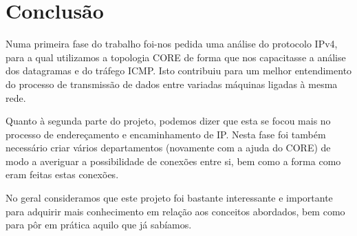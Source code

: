 \documentclass{article}
\begin{document}
\section{Conclusão}
\hspace{0.5cm}Numa primeira fase do trabalho foi-nos pedida uma análise do protocolo IPv4, para a qual utilizamos a topologia CORE de forma que nos capacitasse a análise dos datagramas e do tráfego ICMP. Isto contribuiu para um melhor entendimento do processo de transmissão de dados entre variadas máquinas ligadas à mesma rede. 

\hspace{0.5cm}Quanto à segunda parte do projeto, podemos dizer que esta se focou mais no processo de endereçamento e encaminhamento de IP. Nesta fase foi também necessário criar vários departamentos (novamente com a ajuda do CORE) de modo a averiguar a possibilidade de conexões entre si, bem como a forma como eram feitas estas conexões.

\hspace{0.5cm} No geral consideramos que este projeto foi bastante interessante e importante para adquirir mais conhecimento em relação aos conceitos abordados, bem como para pôr em prática aquilo que já sabíamos.
\cleardoublepage
\end{document}
